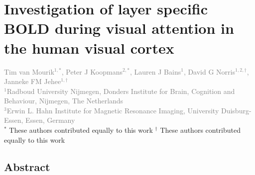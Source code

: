 
\chapter{Investigation of layer specific BOLD during visual attention in the human visual cortex}
\label{ch:attention}

\textcolor{gray}{{Tim van Mourik$^{1,*}$}, Peter J Koopmans$^{2,*}$, Lauren J Bains$^{1}$, David G Norris$^{1,2,\dagger}$, Janneke FM Jehee$^{1,\dagger}$\\
$^{1}$Radboud University Nijmegen, Donders Institute for Brain, Cognition and Behaviour, Nijmegen, The Netherlands \\
$^{3}$Erwin L. Hahn Institute for Magnetic Resonance Imaging, University Duisburg-Essen, Essen, Germany}\\

$^*$ 		{These authors contributed equally to this work}
$^\dagger$  {These authors contributed equally to this work}

\linespread{1.5}
\newpage
\section*{Abstract}

\newpage








